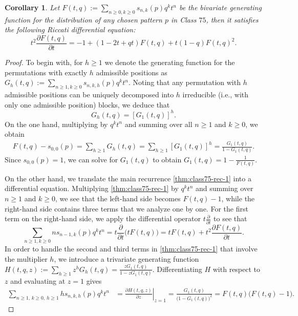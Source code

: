 \documentclass[12pt]{article}
\newtheorem{coro}[thm]{Corollary}
\begin{document}
\begin{coro}\label{cor:riccati}
  Let $F(t,q) := \sum_{n\ge 0, k\ge 0} s_{n,k}(p) q^k t^n$ be the bivariate generating function for the distribution of any chosen pattern $p$ in Class $75$, then it satisfies the following Riccati differential equation:
  \begin{equation}\label{eq:riccati}
    t^2 \frac{\partial F(t,q)}{\partial t} = -1+(1-2t+qt)F(t,q) + t(1-q)F(t,q)^2.
  \end{equation}
\end{coro}

\begin{proof}
  To begin with, for $h \ge 1$ we denote the generating function for the permutations with exactly $h$ admissible positions as $G_h(t,q) := \sum_{n \ge 1, k \ge 0} s_{n,k,h}(p) q^k t^n$. Noting that any permutation with $h$ admissible positions can be uniquely decomposed into $h$ irreducible (i.e., with only one admissible position) blocks, we deduce that
  $$G_h(t,q) = [G_1(t,q)]^h.$$
 On the one hand, multiplying by $q^k t^n$ and summing over all $n \ge 1$ and $k \ge 0$, we obtain
\begin{align*}
    F(t,q) - s_{0,0}(p)
    = \sum_{h \ge 1} G_h(t,q)
    = \sum_{h \ge 1} [G_1(t,q)]^h
    = \frac{G_1(t,q)}{1 - G_1(t,q)}.
\end{align*}
  Since $s_{0,0}(p) = 1$, we can solve for $G_1(t,q)$ to obtain $G_1(t,q) = 1 - \frac{1}{F(t,q)}$.

  On the other hand, we translate the main recurrence \eqref{thm:class75-rec-1} into a differential equation. Multiplying \eqref{thm:class75-rec-1} by $q^k t^n$ and summing over $n \ge 1$ and $k \ge 0$, we see that the left-hand side becomes $F(t,q) - 1$, while the right-hand side contains three terms that we analyze one by one. For the first term on the right-hand side, we apply the differential operator $t \frac{\partial}{\partial t}$ to see that
  \begin{equation}\label{eq:term 1}
    \sum_{n \ge 1, k \ge 0} n s_{n-1,k}(p) q^k t^n = t \frac{\partial}{\partial t} \big(t F(t,q)\big) = t F(t,q) + t^2 \frac{\partial F(t,q)}{\partial t}.
  \end{equation}
   In order to handle the second and third terms in \eqref{thm:class75-rec-1} that involve the multiplier $h$, we introduce a trivariate generating function $H(t,q,z) := \sum_{h \ge 1} z^h G_h(t,q)=\frac{z G_1(t,q)}{1 - z G_1(t,q)}$. Differentiating $H$ with respect to $z$ and evaluating at $z=1$ gives 
  \begin{align}\label{eq:H_derivative}
    \sum_{n \ge 1,\, k \ge 0,\, h \ge 1} h s_{n,k,h}(p) q^k t^n &= \left. \frac{\partial H(t,q,z)}{\partial z} \right|_{z=1} = \frac{G_1(t,q)}{\big(1 - G_1(t,q)\big)^2} = F(t,q)\big(F(t,q) - 1\big).
  \end{align}


\end{proof}
\end{document}
